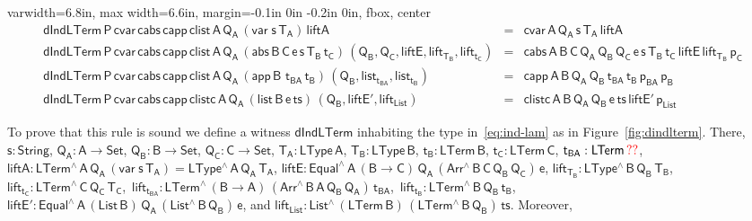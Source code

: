 \documentclass[9pt]{entcs}
\begin{document}
\begin{figure*}[t]

  \begin{adjustbox}{varwidth=6.8in, max width=6.6in, margin=-0.1in 0in
      -0.2in 0in, fbox, center} 
{\small
\[\begin{array}{lll}
\mathsf{dIndLTerm \, P\, cvar \, cabs\, capp\, clist \, A\, Q_A\,
  (var\;s\,T_A) \, liftA} & = & \mathsf{cvar \, A\, Q_A\, s\, T_A\,
  liftA}\\ 
\mathsf{dIndLTerm \, P\, cvar \, cabs\, capp\, clist \, A\, Q_A\,
  (abs \,B \,C \,e \,s \,T_B \, t_C) \, (Q_B , Q_C , liftE,
  lift_{T_B}, lift_{t_C})} & = & \mathsf{cabs\,A\,B\,C\, Q_A\,
  Q_B\, Q_C\, e\, s\, T_B\, t_C\, liftE\, lift_{T_B}\, p_C}\\
\mathsf{dIndLTerm \, P\, cvar \, cabs\, capp\, clist \, A\, Q_A\,
    (app \,B \,\,t_{BA} \, t_B)\, (Q_B , list_{t_{BA}}, list_{t_B})} &
= & \mathsf{capp\,A\,B\,Q_A\, Q_B\, t_{BA}\, t_B\, p_{BA} \, p_B}\\
  \mathsf{dIndLTerm \, P\, cvar \, cabs\, capp\, clistc \, A\, Q_A\,
    (list \,B \,e \, ts) \, (Q_B , liftE', lift_{List})} & = & 
  \mathsf{clistc \,A\,B\,Q_A\, Q_B\, e\, ts\, liftE'\, p_{List} }
\end{array}\]}

\vspace*{-0.1in}

\caption{$\mathsf{dIndLTerm}$}\label{fig:dindlterm} \vspace*{0.1in} 
\end{adjustbox}
\end{figure*}

To prove that this rule is sound we define a witness
$\mathsf{dIndLTerm}$ inhabiting the type in~\eqref{eq:ind-lam} as in
Figure~\ref{fig:dindlterm}. There, $\mathsf{s : String}$, $\mathsf{Q_A
  : A \to Set}$, $\mathsf{Q_B : B \to Set}$, $\mathsf{Q_C : C \to
  Set}$, $\mathsf{T_A : LType\,A}$, $\mathsf{T_B : LType\,B}$,
$\mathsf{t_B : LTerm\,B}$, $\mathsf{t_C : LTerm\,C}$, $\mathsf{t_{BA}
  : LTerm\,{\color{red}??}}$, $\mathsf{liftA : LTerm^{\wedge}\, A\,
  Q_A\, (var\;s\,T_A) = LType^{\wedge}\,A\,Q_A\,T_A}$, $\mathsf{liftE
  : Equal^{\wedge} \, A\, (B \to C)\, Q_A\, (Arr^{\wedge} \, B\, C\,
  Q_B \, Q_C) \, e}$, $\mathsf{lift_{T_B}: LType^{\wedge} \, B\, Q_B\,
  T_B}$,~$\mathsf{lift_{t_C}: LTerm^{\wedge} \, C\, Q_C\,
  T_C}$,~$\mathsf{lift_{t_{BA}}: LTerm^{\wedge} \, (B \to A)\,
  (Arr^{\wedge} \, B\, A\, Q_B \, Q_A)\,
  t_{BA}}$,~$\mathsf{lift_{t_B}: LTerm^{\wedge} \, B\, Q_B\,
  t_B}$,\\ $\mathsf{liftE' : Equal^{\wedge}\, A\, (List\,B)\, Q_A\,
  (List^{\wedge}\, B\, Q_B)\, e}$, and $\mathsf{lift_{List}:
  List^{\wedge} \, (LTerm\, B) \, (LTerm^{\wedge}\, B\, Q_B) \, ts}$.
Moreover,
\end{document}
